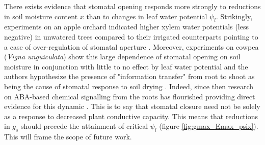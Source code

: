 \documentclass[utf8]{frontiersSCNS} %
\begin{document}
There exists evidence that stomatal opening responds more strongly to reductions in soil moisture content $x$ than to changes in leaf water potential $\psi_l$. Strikingly, experiments on an apple orchard indicated higher xylem water potentials (less negative) in unwatered trees compared to their irrigated counterparts pointing to a case of over-regulation of stomatal aperture \citep{jones1983experimental}. Moreover, experiments on cowpea (\textit{Vigna unguiculata}) show this large dependence of stomatal opening on soil moisture in conjunction with little to no effect by leaf water potential and the authors hypothesize the presence of "information transfer" from root to shoot as being the cause of stomatal response to soil drying \citep{bates1981stomatal}. Indeed, since then research on ABA-based chemical signalling from the roots has flourished providing direct evidence for this dynamic \citep{davies1991root}. This is to say that stomatal closure need not be solely as a response to decreased plant conductive capacity. This means that reductions in $g_s$ should precede the attainment of critical $\psi_l$ (figure \ref{fig:gmax_Emax_psix}). This will frame the scope of future work.
\end{document}
